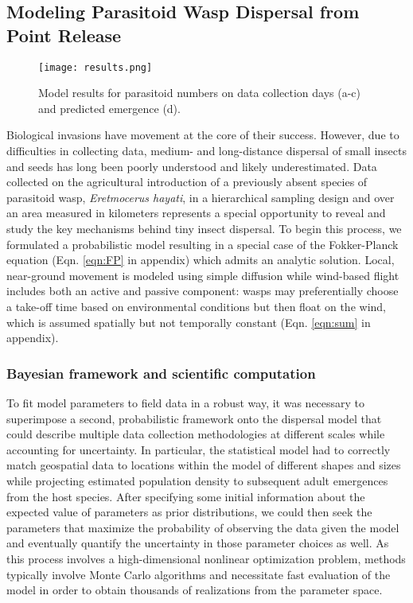 \documentclass[11pt]{article}
\begin{document}
\subsection{Modeling Parasitoid Wasp Dispersal from Point Release}

\begin{figure}[b]
\vspace{-10pt}
\begin{center}
\texttt{[image: results.png]}
\caption{Model results for parasitoid numbers on data collection days (a-c) and predicted emergence (d).}
\label{fig:parasitoids}
\end{center}
\vspace{-20pt}
\end{figure}

Biological invasions have movement at the core of their success. However, due to difficulties in collecting data, medium- and long-distance dispersal of small insects and seeds has long been poorly understood and likely underestimated. Data collected on the agricultural introduction of a previously absent species of parasitoid wasp, \textit{Eretmocerus hayati}, in a hierarchical sampling design and over an area measured in kilometers \cite{Kristensen13} represents a special opportunity to reveal and study the key mechanisms behind tiny insect dispersal. To begin this process, we formulated a probabilistic model resulting in a special case of the Fokker-Planck equation (Eqn. \ref{eqn:FP} in appendix) which admits an analytic solution. Local, near-ground movement is modeled using simple diffusion while wind-based flight includes both an active and passive component: wasps may preferentially choose a take-off time based on environmental conditions but then float on the wind, which is assumed spatially but not temporally constant (Eqn. \ref{eqn:sum} in appendix).

\subsubsection{Bayesian framework and scientific computation}

To fit model parameters to field data in a robust way, it was necessary to superimpose a second, probabilistic framework onto the dispersal model that could describe multiple data collection methodologies at different scales while accounting for uncertainty. In particular, the statistical model had to correctly match geospatial data to locations within the model of different shapes and sizes while projecting estimated population density to subsequent adult emergences from the host species. After specifying some initial information about the expected value of parameters as prior distributions, we could then seek the parameters that maximize the probability of observing the data given the model and eventually quantify the uncertainty in those parameter choices as well. As this process involves a high-dimensional nonlinear optimization problem, methods typically involve Monte Carlo algorithms and necessitate fast evaluation of the model in order to obtain thousands of realizations from the parameter space.
\end{document}
